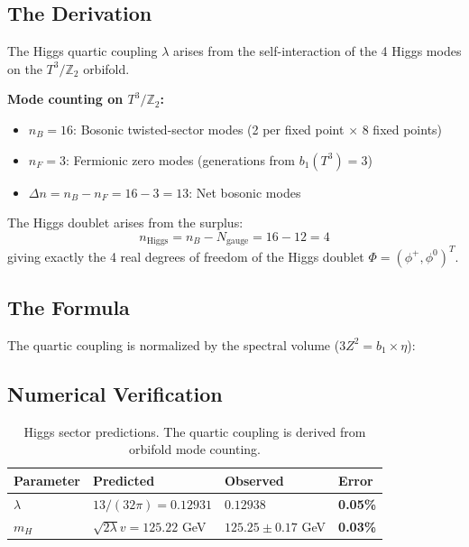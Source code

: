 \documentclass[11pt,a4paper]{article}
\theoremstyle{plain}
\theoremstyle{definition}
\theoremstyle{remark}
\begin{document}
\subsection{The Derivation}

The Higgs quartic coupling $\lambda$ arises from the self-interaction of the 4 Higgs modes on the $T^3/\mathbb{Z}_2$ orbifold.

\textbf{Mode counting on $T^3/\mathbb{Z}_2$:}
\begin{itemize}
  \item $n_B = 16$: Bosonic twisted-sector modes (2 per fixed point $\times$ 8 fixed points)
  \item $n_F = 3$: Fermionic zero modes (generations from $b_1(T^3) = 3$)
  \item $\Delta n = n_B - n_F = 16 - 3 = 13$: Net bosonic modes
\end{itemize}

The Higgs doublet arises from the surplus:
\[
n_{\text{Higgs}} = n_B - N_{\text{gauge}} = 16 - 12 = 4
\]
giving exactly the 4 real degrees of freedom of the Higgs doublet $\Phi = (\phi^+, \phi^0)^T$.

\subsection{The Formula}

The quartic coupling is normalized by the spectral volume ($3Z^2 = b_1 \times \eta$):

\begin{center}
\end{center}

\subsection{Numerical Verification}

\begin{table}[h!]
\centering
\begin{tabular}{llll}
\toprule
\textbf{Parameter} & \textbf{Predicted} & \textbf{Observed} & \textbf{Error} \\
\midrule
$\lambda$ & $13/(32\pi) = 0.12931$ & $0.12938$ & \textbf{0.05\%} \\
$m_H$ & $\sqrt{2\lambda} v = 125.22$ GeV & $125.25 \pm 0.17$ GeV & \textbf{0.03\%} \\
\bottomrule
\end{tabular}
\caption{Higgs sector predictions. The quartic coupling is derived from orbifold mode counting.}
\end{table}
\end{document}
